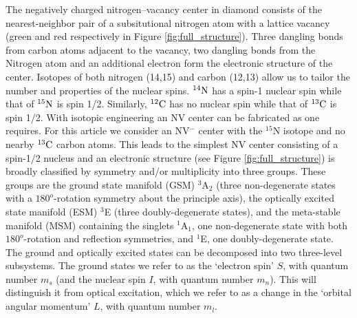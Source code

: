 \documentclass[aps,pra,amsmath,amssymb,reprint,superscriptaddress,tightenlines]{revtex4-1}
\begin{document}
The negatively charged nitrogen--vacancy center in diamond consists of the nearest-neighbor pair of a subsitutional nitrogen atom with a lattice vacancy (green and red respectively in Figure \ref{fig:full_structure}).
Three dangling bonds from carbon atoms adjacent to the vacancy, two dangling bonds from the Nitrogen atom and an additional electron form the electronic structure of the center.
Isotopes of both nitrogen (14,15) and carbon (12,13) allow us to  tailor  the number and properties of the nuclear spins. $^{14}{\rm N}$ has a spin-1 nuclear spin while that of $^{15}{\rm N}$ is spin 1/2. Similarly, $^{12}{\rm C}$ has no nuclear spin while that of $^{13}{\rm C}$ is spin 1/2.  With isotopic engineering an NV center can be fabricated as one requires. For this article we consider an NV$^{-}$ center with the $^{15}$N isotope and no nearby $^{13}{\rm C}$ carbon atoms. This leads to the simplest NV center consisting of a spin-1/2 nucleus and an electronic structure (see Figure \ref{fig:full_structure}) is broadly classified by symmetry and/or multiplicity into three groups. These groups are the ground state manifold (GSM) $^{3}$A$_{2}$ (three non-degenerate states with a $180^{o}$-rotation symmetry about the principle axis), the optically excited state manifold (ESM) $^{3}$E (three doubly-degenerate states), and the meta-stable manifold (MSM) containing the singlets $^{1}$A$_{1}$, one non-degenerate state with both $180^{o}$-rotation and reflection symmetries, and $^{1}$E, one doubly-degenerate state.  The ground and optically excited states can be decomposed into two three-level subsystems. The ground states we refer to as the `electron spin' $S$, with quantum number $m_{s}$ (and the nuclear spin $I$, with quantum number $m_{n}$). This will distinguish it from optical excitation, which we refer to as a change in the `orbital angular momentum' $L$, with quantum number $m_{l}$.
\end{document}
